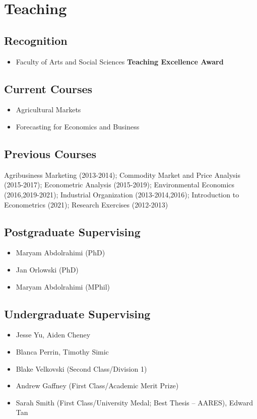 \documentclass[10pt]{article}
\begin{document}
	\section*{Teaching}
	
	\subsection*{Recognition}
	\begin{itemize}
		\item {} Faculty of Arts and Social Sciences \textbf{Teaching Excellence Award}
	\end{itemize}
	\subsection*{Current Courses}
	\begin{itemize}
		\item {} Agricultural Markets
		\item {} Forecasting for Economics and Business
	\end{itemize}
	
	\subsection*{Previous Courses}	
	Agribusiness Marketing (2013-2014); Commodity Market and Price Analysis (2015-2017); Econometric Analysis (2015-2019); Environmental Economics (2016,2019-2021); Industrial Organization (2013-2014,2016); Introduction to Econometrics (2021); Research Exercises (2012-2013)
	
	\subsection*{Postgraduate Supervising}	
	\begin{itemize}
		\item {} Maryam Abdolrahimi (PhD)
		\item {} Jan Orlowski (PhD)
		\item {} Maryam Abdolrahimi (MPhil)
	\end{itemize}

	\subsection*{Undergraduate Supervising}	
	\begin{itemize}
		\item {} Jesse Yu, Aiden Cheney
		\item {} Blanca Perrin, Timothy Simic
		\item {} Blake Velkovski (Second Class/Division 1)
		\item {} Andrew Gaffney (First Class/Academic Merit Prize)
		\item {} Sarah Smith (First Class/University Medal; Best Thesis -- AARES), Edward Tan
	\end{itemize}
	
\end{document}
